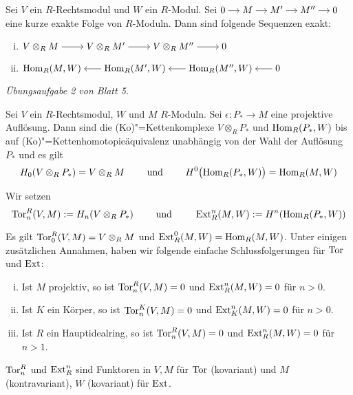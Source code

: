 \begin{lemma}
	Sei $V$ ein $R$-Rechtsmodul und $W$ ein $R$-Modul.
	Sei $\begin{tikzcd}[cramped,sep=small]
		0 \rar& M \rar &M' \rar & M'' \rar & 0
	\end{tikzcd}$ 
	eine kurze exakte Folge von $R$-Moduln.
	Dann sind folgende Sequenzen exakt:
	\begin{enumerate}[(i)]
		\item \( \begin{tikzcd}[cramped,sep=2.3em]
					V \otimes_R M \rar & V \otimes_R M' \rar & V \otimes_R M'' \rar & 0
				\end{tikzcd} \)
		\item $\begin{tikzcd}[cramped,sep=1.8em]
			\Hom_R(M,W)  & \Hom_R(M',W) \lar & \Hom_R(M'',W) \lar & 0 \lar
		\end{tikzcd}$
	\end{enumerate}
\end{lemma}
\begin{beweis}
	\emph{Übungsaufgabe 2 von Blatt 5.}
\end{beweis}

\begin{lemma}
	Sei $V$ ein $R$-Rechtsmodul, $W$ und $M$  $R$-Moduln.
	Sei $\epsilon \colon P_* \to M$ eine projektive Auflösung.
	Dann sind die (Ko)"=Kettenkomplexe $V \otimes_R P_*$ und $\Hom_R(P_*,W)$ bis auf (Ko)"=Kettenhomotopieäquivalenz unabhängig von der Wahl der Auflösung $P_*$ und es gilt
	\[
		H_0(V \otimes_R P_*) = V \otimes_R M \qquad \text{ und } \qquad H^0 \enbrace[\big]{\Hom_R(P_*,W)} = \Hom_R(M,W)
	\]
\end{lemma}

\noindent{}

\begin{definition}[{name=[Tor und Ext]}]
	Wir setzen
	\[
		\Tor_n^R(V,M) := H_n(V \otimes_R P_*) \qquad \text{ und } \qquad \Ext_R^n(M,W) := H^n \enbrace*{\Hom_R(P_*,W)} 
	\]
\end{definition}

\begin{bemerkung}[label=bem:tor_ext_koerper_hir]
	Es gilt $\Tor_0^R(V,M) = V \otimes_R M$ und $\Ext_R^0(M,W)=\Hom_R(M,W)$.
	Unter einigen zusätzlichen Annahmen, haben wir folgende einfache Schlussfolgerungen für $\Tor$ und $\Ext$:
	\begin{enumerate}[(i)]
		\item Ist $M$ projektiv, so ist $\Tor_n^R(V,M)=0$ und $\Ext_R^n(M,W)=0$ für $n>0$.
		\item Ist $K$ ein Körper, so ist $\Tor_n^K(V,M)=0$ und $\Ext_K^n(M,W)=0$ für $n>0$.
		\item Ist $R$ ein Hauptidealring, so ist $\Tor_n^R(V,M)=0$ und $\Ext_R^n(M,W)=0$ für $n>1$.
	\end{enumerate}
	$\Tor^R_n$ und $\Ext_R^n$ sind Funktoren in $V,M$ für $\Tor$ (kovariant) und $M$ (kontravariant), $W$ (kovariant) für $\Ext$.
\end{bemerkung}

